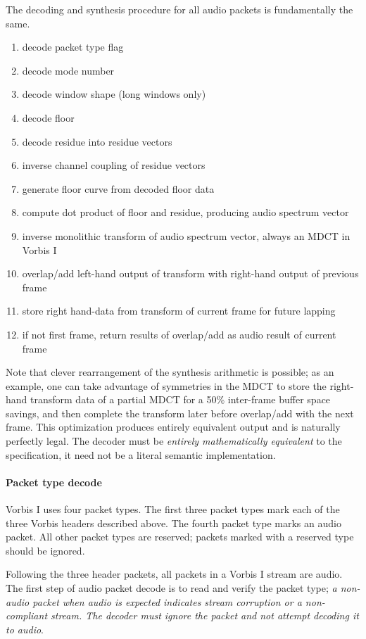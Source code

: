 The decoding and synthesis procedure for all audio packets is
fundamentally the same.
\begin{enumerate}
\item decode packet type flag
\item decode mode number
\item decode window shape (long windows only)
\item decode floor
\item decode residue into residue vectors
\item inverse channel coupling of residue vectors
\item generate floor curve from decoded floor data
\item compute dot product of floor and residue, producing audio spectrum vector
\item inverse monolithic transform of audio spectrum vector, always an MDCT in Vorbis I
\item overlap/add left-hand output of transform with right-hand output of previous frame
\item store right hand-data from transform of current frame for future lapping
\item if not first frame, return results of overlap/add as audio result of current frame
\end{enumerate}

Note that clever rearrangement of the synthesis arithmetic is
possible; as an example, one can take advantage of symmetries in the
MDCT to store the right-hand transform data of a partial MDCT for a
50\% inter-frame buffer space savings, and then complete the transform
later before overlap/add with the next frame.  This optimization
produces entirely equivalent output and is naturally perfectly legal.
The decoder must be \emph{entirely mathematically equivalent} to the
specification, it need not be a literal semantic implementation.

\paragraph{Packet type decode}

Vorbis I uses four packet types. The first three packet types mark each
of the three Vorbis headers described above. The fourth packet type
marks an audio packet. All other packet types are reserved; packets
marked with a reserved type should be ignored.

Following the three header packets, all packets in a Vorbis I stream
are audio.  The first step of audio packet decode is to read and
verify the packet type; \emph{a non-audio packet when audio is expected
indicates stream corruption or a non-compliant stream. The decoder
must ignore the packet and not attempt decoding it to
audio}.




